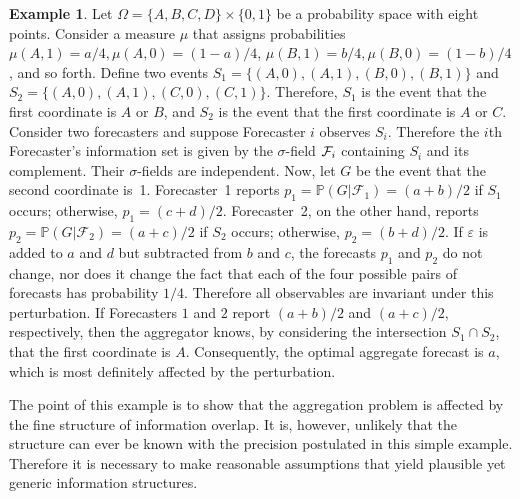 \documentclass[12pt]{article}
\renewcommand{\P}{\mathbb{P}}
\theoremstyle{definition}
\newtheorem{example}[theorem]{Example}
\theoremstyle{definition}
\def\F{{\cal F}}
\def\P{{\mathbb P}}
\def\ee{\varepsilon}
\begin{document}
\begin{example}
Let $\Omega = \{ A,B,C,D \} \times \{ 0,1 \}$ be a probability space
with eight points.  Consider a measure $\mu$ that assigns
probabilities $\mu (A,1) = a/4, \mu (A,0) = (1-a)/4$, $\mu (B,1) =
b/4, \mu (B,0) = (1-b)/4$, and so forth. Define two events $S_1 = \{(A,0),(A,1),(B,0),(B,1) \}$ and $S_2 = \{(A,0),(A,1),(C,0),(C,1) \}$. Therefore, $S_1$ is the event that the first coordinate is
$A$ or $B$, and $S_2$ is the event that the first coordinate
is $A$ or $C$. Consider two forecasters and suppose Forecaster $i$ observes $S_i$. Therefore the $i$th Forecaster's information set is
given by the $\sigma$-field $\F_i$ containing $S_i$ and its
complement. Their $\sigma$-fields are independent. Now, let
$G$ be the event that the second coordinate is~1.  Forecaster~1
reports $p_1 = \P(G | \mathcal{F}_1) = (a+b)/2$ if $S_1$ occurs;
otherwise, $p_1 = (c+d)/2$.  Forecaster~2, on the other hand, reports
$p_2 = \P(G | \mathcal{F}_2) = (a+c)/2$ if $S_2$ occurs; otherwise,
$p_2 = (b+d)/2$.  If $\ee$ is added to $a$ and $d$ but subtracted from
$b$ and $c$, the forecasts $p_1$ and $p_2$ do not change, nor does it
change the fact that each of the four possible pairs of forecasts has
probability $1/4$.  Therefore all observables are invariant under
this perturbation.  If Forecasters $1$ and $2$ report $(a+b)/2$ and
$(a+c)/2$, respectively, then the aggregator knows, by considering the
intersection $S_1 \cap S_2$, that the first coordinate is $A$.
Consequently, the optimal aggregate forecast is $a$, which is most
definitely affected by the perturbation.
\end{example}

The point of this example is to show that the aggregation problem is affected
by the fine structure of information overlap.  It is, however, unlikely
that the structure can ever be known with the precision postulated in
this simple example.  Therefore it is necessary to make reasonable
assumptions that yield plausible yet generic information structures.
\end{document}
